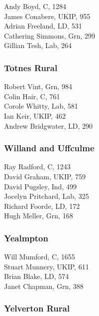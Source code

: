 \documentclass[a4paper,openany,10pt]{book}
\begin{document}


Andy Boyd, C, 1284\\
James Conabere, UKIP, 955\\
Adrian Freeland, LD, 531\\
Cathering Simmons, Grn, 299\\
Gillian Tesh, Lab, 264\\


\subsubsection*{Totnes Rural}



Robert Vint, Grn, 984\\
Colin Hair, C, 761\\
Corole Whitty, Lab, 581\\
Ian Keir, UKIP, 462\\
Andrew Bridgwater, LD, 290\\


\subsubsection*{Willand and Uffculme}



Ray Radford, C, 1243\\
David Graham, UKIP, 759\\
David Pugsley, Ind, 499\\
Jocelyn Pritchard, Lab, 325\\
Richard Foorde, LD, 172\\
Hugh Meller, Grn, 168\\


\subsubsection*{Yealmpton}



Will Mumford, C, 1655\\
Stuart Munnery, UKIP, 611\\
Brian Blake, LD, 574\\
Janet Chapman, Grn, 388\\


\subsubsection*{Yelverton Rural}
\end{document}
